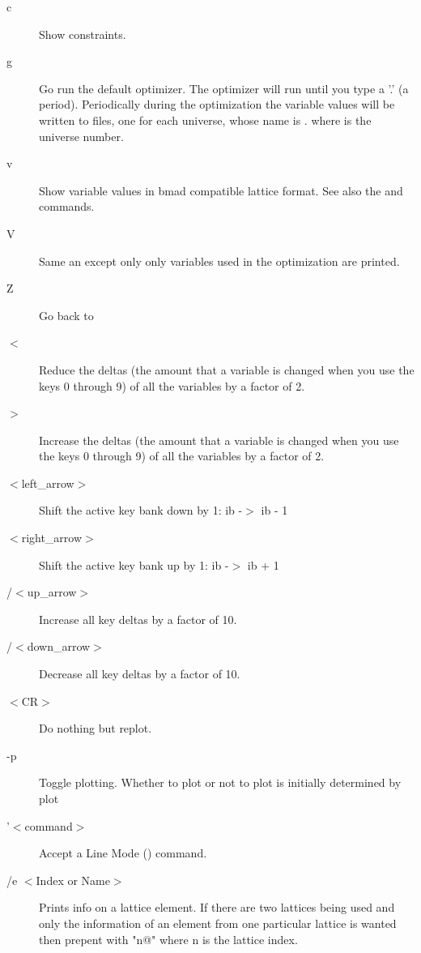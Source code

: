 \begin{description}
\item[c]  
Show constraints.

\item[g]
Go run the default optimizer. The optimizer will run until you type a
'.' (a period).  Periodically during the optimization the variable
values will be written to files, one for each universe, whose name is
. where \vn{\#} is the universe number.

\item[v]
Show variable values in bmad compatible lattice format. See also the
 and  commands.

\item[V] 
Same an  except only only variables used in the optimization are printed.

\item[Z] 
Go back to 

\item[$<$]
Reduce the deltas (the amount that a variable is changed when you use
the keys 0 through 9) of all the variables by a factor of 2.

\item[$>$]
Increase the deltas (the amount that a variable is changed when you
use the keys 0 through 9) of all the variables by a factor of 2.

\item[$<$left\_arrow$>$]
Shift the active key bank down by 1: ib -$>$ ib - 1

\item[$<$right\_arrow$>$]
Shift the active key bank up by 1: ib -$>$ ib + 1

\item[/$<$up\_arrow$>$]
Increase all key deltas by a factor of 10.

\item[/$<$down\_arrow$>$]
Decrease all key deltas by a factor of 10.

\item[$<$CR$>$]
Do nothing but replot.

\item[-p]
Toggle plotting. Whether to plot or not to plot is initially
determined by plot%

\item['$<$command$>$]
Accept a Line Mode () command.

\item[/e $<$Index or Name$>$]
Prints info on a lattice element. If there are two lattices being used
and only the information of an element from one particular lattice is
wanted then prepent with "n@" where n is the lattice
index.


\end{description}
